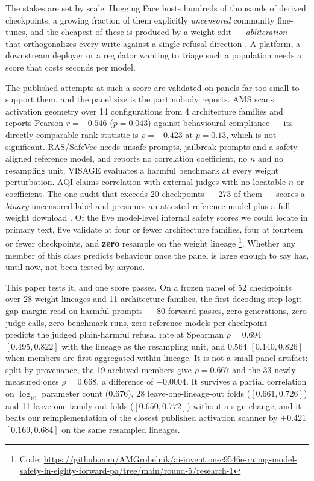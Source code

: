 \documentclass[11pt,letterpaper]{article}
\begin{document}
The stakes are set by scale. Hugging Face hosts hundreds of thousands of derived checkpoints, a growing fraction of them explicitly \emph{uncensored} community fine-tunes, and the cheapest of these is produced by a weight edit --- \emph{abliteration} --- that orthogonalizes every write against a single refusal direction \citep{Arditi2024}. A platform, a downstream deployer or a regulator wanting to triage such a population needs a score that costs seconds per model.

The published attempts at such a score are validated on panels far too small to support them, and the panel size is the part nobody reports. AMS \citep{Messenger2026} scans activation geometry over 14 configurations from 4 architecture families and reports Pearson $r = -0.546$ ($p = 0.043$) against behavioural compliance --- its directly comparable rank statistic is $\rho = -0.423$ at $p = 0.13$, which is not significant. RAS/SafeVec \citep{Huang2026} needs unsafe prompts, jailbreak prompts and a safety-aligned reference model, and reports no correlation coefficient, no $n$ and no resampling unit. VISAGE \citep{Peng2024} evaluates a harmful benchmark at every weight perturbation. AQI \citep{Borah2025} claims correlation with external judges with no locatable $n$ or coefficient. The one audit that exceeds 20 checkpoints --- 273 of them --- scores a \emph{binary} uncensored label and presumes an attested reference model plus a full weight download \citep{Hurtado2026}. Of the five model-level internal safety scores we could locate in primary text, five validate at four or fewer architecture families, four at fourteen or fewer checkpoints, and \textbf{zero} resample on the weight lineage \footnote{Code: \url{https://github.com/AMGrobelnik/ai-invention-c9546e-rating-model-safety-in-eighty-forward-pa/tree/main/round-5/research-1}}. Whether any member of this class predicts behaviour once the panel is large enough to say has, until now, not been tested by anyone.

This paper tests it, and one score passes. On a frozen panel of 52 checkpoints over 28 weight lineages and 11 architecture families, the first-decoding-step logit-gap margin read on harmful prompts --- 80 forward passes, zero generations, zero judge calls, zero benchmark runs, zero reference models per checkpoint --- predicts the judged plain-harmful refusal rate at Spearman $\rho = 0.694$ $[0.495, 0.822]$ with the lineage as the resampling unit, and $0.564$ $[0.140, 0.826]$ when members are first aggregated within lineage. It is not a small-panel artifact: split by provenance, the 19 archived members give $\rho = 0.667$ and the 33 newly measured ones $\rho = 0.668$, a difference of $-0.0004$. It survives a partial correlation on $\log_{10}$ parameter count ($0.676$), 28 leave-one-lineage-out folds ($[0.661, 0.726]$) and 11 leave-one-family-out folds ($[0.650, 0.772]$) without a sign change, and it beats our reimplementation of the closest published activation scanner by $+0.421$ $[0.169, 0.684]$ on the same resampled lineages.
\end{document}

